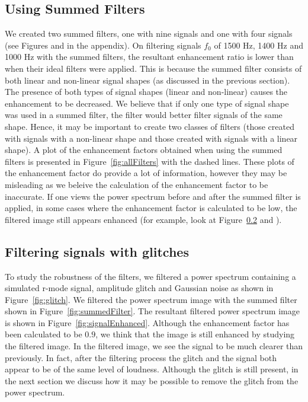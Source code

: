 \documentclass[%
reprint,
amsmath,amssymb,
aps,
]{revtex4-1}
\begin{document}
	
	
	
	
	\subsection{Using Summed Filters}
	We created two summed filters, one with nine signals and one with four signals (see Figures{} and {} in the appendix). On filtering signals $f_0$ of 1500 Hz, 1400 Hz and 1000 Hz with the summed filters, the resultant enhancement ratio is lower than when their ideal filters were applied. This is because the summed filter consists of both linear and non-linear signal shapes (as discussed in the previous section). The presence of both types of signal shapes (linear and non-linear) causes the enhancement to be decreased. We believe that if only one type of signal shape was used in a summed filter, the filter would better filter signals of the same shape. Hence, it may be important to create two classes of filters (those created with signals with a non-linear shape and those created with signals with a linear shape). A plot of the enhancement factors obtained when using the summed filters is presented in Figure~\ref{fig:allFilters} with the dashed lines. 
	These plots of the enhancement factor do provide a lot of information, however they may be misleading as we beleive the calculation of the enhancement factor to be inaccurate. If one views the power spectrum before and after the summed filter is applied, in some cases where the enhancement factor is calculated to be low, the filtered image still appears enhanced (for example, look at Figure~\ref{} and {}).
	
	
	\subsection{Filtering signals with glitches}
	To study the robustness of the filters, we filtered a power spectrum containing a simulated r-mode signal, amplitude glitch and Gaussian noise as shown in Figure~\ref{fig:glitch}. We filtered the power spectrum image with the summed filter shown in Figure~\ref{fig:summedFilter}. The resultant filtered power spectrum image is shown in Figure~\ref{fig:signalEnhanced}. Although the enhancement factor has been calculated to be $0.9$, we think that the image is still enhanced by studying the filtered image. In the filtered image, we see the signal to be much clearer than previously. In fact, after the filtering process the glitch and the signal both appear to be of the same level of loudness. Although the glitch is still present, in the next section we discuss how it may be possible to remove the glitch from the power spectrum. 
	
\end{document}
